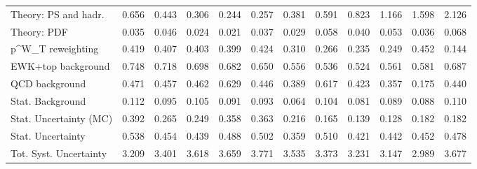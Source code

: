\begin{tabular}{l|p{0.6cm}p{0.6cm}p{0.6cm}p{0.6cm}p{0.6cm}p{0.6cm}p{0.6cm}p{0.6cm}p{0.6cm}p{0.6cm}p{0.6cm}}
Theory: PS and hadr.                     & 0.656 & 0.443 & 0.306 & 0.244 & 0.257 & 0.381 & 0.591 & 0.823 & 1.166 & 1.598 & 2.126 \\
Theory: PDF                              & 0.035 & 0.046 & 0.024 & 0.021 & 0.037 & 0.029 & 0.058 & 0.040 & 0.053 & 0.036 & 0.068 \\
p^{W}_{T} reweighting                    & 0.419 & 0.407 & 0.403 & 0.399 & 0.424 & 0.310 & 0.266 & 0.235 & 0.249 & 0.452 & 0.144 \\
EWK+top background                       & 0.748 & 0.718 & 0.698 & 0.682 & 0.650 & 0.556 & 0.536 & 0.524 & 0.561 & 0.581 & 0.687 \\
QCD background                           & 0.471 & 0.457 & 0.462 & 0.629 & 0.446 & 0.389 & 0.617 & 0.423 & 0.357 & 0.175 & 0.440 \\
Stat. Background                         & 0.112 & 0.095 & 0.105 & 0.091 & 0.093 & 0.064 & 0.104 & 0.081 & 0.089 & 0.088 & 0.110 \\
Stat. Uncertainty (MC)                   & 0.392 & 0.265 & 0.249 & 0.358 & 0.363 & 0.216 & 0.165 & 0.139 & 0.128 & 0.182 & 0.182 \\
\hline
Stat. Uncertainty                        & 0.538 & 0.454 & 0.439 & 0.488 & 0.502 & 0.359 & 0.510 & 0.421 & 0.442 & 0.452 & 0.478 \\
\hline
Tot. Syst. Uncertainty                   & 3.209 & 3.401 & 3.618 & 3.659 & 3.771 & 3.535 & 3.373 & 3.231 & 3.147 & 2.989 & 3.677 \\
\hline
\end{tabular}
